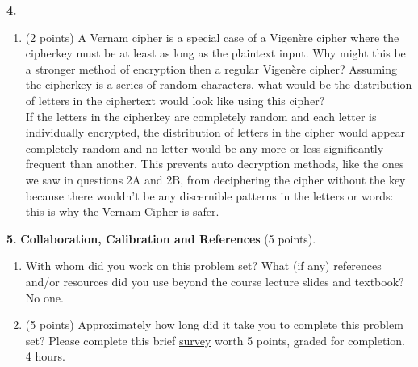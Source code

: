 \documentclass[12pt]{amsart}
\newenvironment{statement}[1]{\smallskip\noindent\color[rgb]{0.0,0.0,0.0} {\bf #1.}}{}
\theoremstyle{definition}
\theoremstyle{remark}
\newcommand{\1}{\mathds{1}}
\begin{document}
\begin{statement}{4}
\begin{enumerate}
\begin{enumerate}
            For example, consider the plaintext ``helloworld" and a cipherkey ``neat". We need to create a key with 10 characters, while neat only has 4. We therefore repeat our cipherkey to produce our final key: ``neatneatne". We then encrypt using the column for our first letter, ``h", using the row of our first letter of the cipher, ``n", to get the first letter of our ciphertext, ``t". Repeat the process to get the full ciphertext, ``tilebaokyg". We can then decrypt the first letter of our ciphertext, ``t", using the row of first letter of our cipherkey, "n", and locating the "t" in that row. ``t" in this row is located in column ``h", giving us our first plaintext letter. We repeat this process to then generate our full plaintext string ``helloworld". 
            
            \item (2 points) A Vernam cipher is a special case of a Vigenère cipher where the cipherkey must be at least as long as the plaintext input. Why might this be a stronger method of encryption then a regular Vigenère cipher? Assuming the cipherkey is a series of random characters, what would be the distribution of letters in the ciphertext would look like using this cipher?
            \\ If the letters in the cipherkey are completely random and each letter is individually encrypted, the distribution of letters in the cipher would appear completely random and no letter 
            would be any more or less significantly frequent than another. This prevents auto decryption methods, like the ones we saw in questions 2A and 2B, from deciphering the 
            cipher without the key because there wouldn't be any discernible patterns in the letters or words: this is why the Vernam Cipher is safer. 

        \end{enumerate}

\end{enumerate}
\end{statement}

\newpage
\begin{statement}{5}
\noindent \textbf{Collaboration, Calibration and References} (5 points).
\begin{enumerate}
    \item With whom did you work on this problem set? What (if any) references and/or resources did you use beyond the course lecture slides and textbook? 
    \\ No one.
    \item (5 points) Approximately how long did it take you to complete this problem set? Please complete this brief \href{https://forms.gle/4Mip65wtTpkNxBTj9}{survey} worth 5 points, graded for completion.\\
    4 hours. 
\end{enumerate}
\end{statement}
\end{document}
